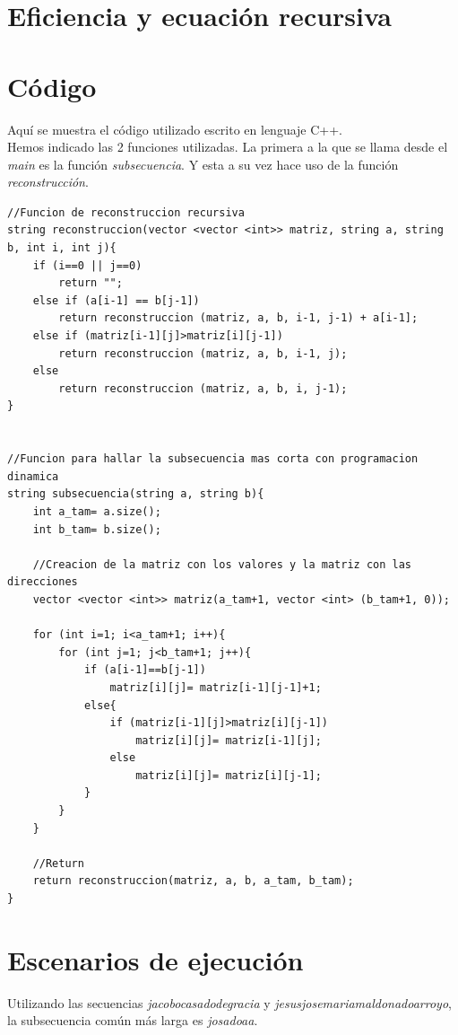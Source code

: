 \documentclass[11pt,a4paper]{article} %
\begin{document}
\newpage
\section{Eficiencia y ecuación recursiva}



\newpage
\section{Código}
Aquí se muestra el código utilizado escrito en lenguaje C++.\\

Hemos indicado las 2 funciones utilizadas. La primera a la que se llama desde el \textit{main} es la función \textit{subsecuencia}. Y esta a su vez hace uso de la función \textit{reconstrucción}.

\begin{lstlisting}[style=C++]
//Funcion de reconstruccion recursiva
string reconstruccion(vector <vector <int>> matriz, string a, string b, int i, int j){
	if (i==0 || j==0)
		return "";
	else if (a[i-1] == b[j-1])
		return reconstruccion (matriz, a, b, i-1, j-1) + a[i-1];
	else if (matriz[i-1][j]>matriz[i][j-1])
		return reconstruccion (matriz, a, b, i-1, j);
	else
		return reconstruccion (matriz, a, b, i, j-1);
}


//Funcion para hallar la subsecuencia mas corta con programacion dinamica
string subsecuencia(string a, string b){
	int a_tam= a.size();
	int b_tam= b.size();
	
	//Creacion de la matriz con los valores y la matriz con las direcciones
	vector <vector <int>> matriz(a_tam+1, vector <int> (b_tam+1, 0));
	
	for (int i=1; i<a_tam+1; i++){
		for (int j=1; j<b_tam+1; j++){
			if (a[i-1]==b[j-1])
				matriz[i][j]= matriz[i-1][j-1]+1;
			else{
				if (matriz[i-1][j]>matriz[i][j-1])
					matriz[i][j]= matriz[i-1][j];
				else
					matriz[i][j]= matriz[i][j-1];
			}
		}
	}	
	
	//Return
	return reconstruccion(matriz, a, b, a_tam, b_tam);
}
\end{lstlisting}

\newpage
\section{Escenarios de ejecución}
Utilizando las secuencias \textit{jacobocasadodegracia} y \textit{jesusjosemariamaldonadoarroyo}, la subsecuencia común más larga es \textit{josadoaa}.\\
\end{document}
